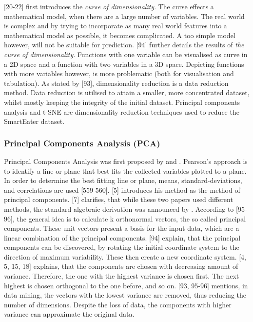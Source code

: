 
\textcite{bellman1957dynamic}[20-22] first introduces the \textit{curse of dimensionality}. The curse effects a mathematical model, when there are a large number of variables. The real world is complex and by trying to incorporate as many real world features into a mathematical model as possible, it becomes complicated. A too simple model however, will not be suitable for prediction. 
\textcite{bellman1961adaptive}[94] further details the results of \textit{the curse of dimensionality}. Functions with one variable can be visualised as curve in a 2D space and a function with two variables in a 3D space. Depicting functions with more variables however, is more problematic (both for visualisation and tabulation). As stated by \textcite{han2011data}[93], dimensionality reduction is a data reduction method. Data reduction is utilised to attain a smaller, more concentrated dataset, whilst mostly keeping the integrity of the initial dataset. Principal components analysis and t-SNE are dimensionality reduction techniques used to reduce the SmartEater dataset.


\subsubsection{Principal Components Analysis (PCA)}
Principal Components Analysis was first proposed by \textcite{OnLinesAndPlanes1901} and \textcite{hotelling1933analysis}.
Pearson's approach is to identify a line or plane that best fits the collected variables plotted to a plane. In order to determine the best fitting line or plane, means, standard-deviations, and correlations are used \autocite{OnLinesAndPlanes1901}[559-560].
\textcite{hotelling1933analysis}[5] introduces his method as the method of principal components. \textcite{jolliffe2002PCA}[7] clarifies, that while these two papers used different methods, the standard algebraic
derivation was announced by \textcite{hotelling1933analysis}. According to \textcite{han2011data}[95-96], the general idea is to calculate k orthonormal vectors, the so called principal components. These unit vectors present a basis for the input data, which are a linear combination of the principal components. \textcite{DataMiningAndPredictiveAnalytics}[94] explain, that the principal components can be discovered, by rotating the initial coordinate system to the direction of maximum variability. These then create a new coordinate system. \textcite{hotelling1933analysis}[4, 5, 15, 18] explains, that the components are chosen with decreasing amount of variance. Therefore, the one with the highest variance is chosen first. The next highest is chosen orthogonal to the one before, and so on. \textcite{han2011data}[93, 95-96] mentions, in data mining, the vectors with the lowest variance are removed, thus reducing the number of dimensions. Despite the loss of data, the components with higher variance can approximate the original data.


